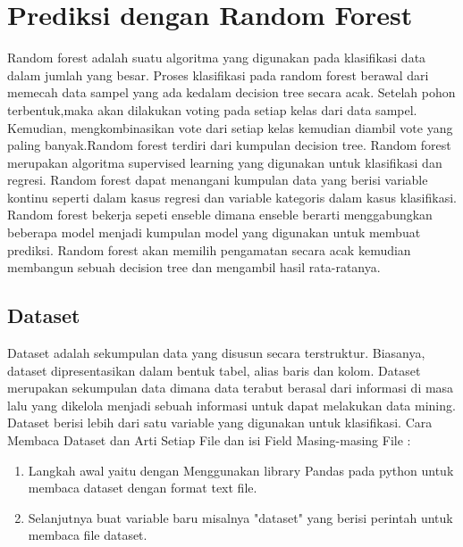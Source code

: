\chapter{Prediksi dengan Random Forest}

Random forest adalah suatu algoritma yang digunakan pada klasifikasi data dalam jumlah yang besar. Proses klasifikasi pada random forest berawal dari memecah data sampel yang ada kedalam decision tree secara acak. Setelah pohon terbentuk,maka akan dilakukan voting pada setiap kelas dari data sampel. Kemudian, mengkombinasikan vote dari setiap kelas kemudian diambil vote yang paling banyak.Random forest terdiri dari kumpulan decision tree. Random forest merupakan algoritma supervised learning yang digunakan untuk klasifikasi dan regresi. Random forest dapat menangani kumpulan data yang berisi variable kontinu seperti dalam kasus regresi dan variable kategoris dalam kasus klasifikasi. Random forest bekerja sepeti enseble dimana enseble berarti menggabungkan beberapa model menjadi kumpulan model yang digunakan untuk membuat prediksi. Random forest akan memilih pengamatan secara acak kemudian membangun sebuah decision tree dan mengambil hasil rata-ratanya.

\section{Dataset}
Dataset adalah sekumpulan data yang disusun secara terstruktur. Biasanya, dataset dipresentasikan dalam bentuk tabel, alias baris dan kolom. Dataset merupakan sekumpulan data dimana data terabut berasal dari informasi di masa lalu yang dikelola menjadi sebuah informasi untuk dapat melakukan data mining. Dataset berisi lebih dari satu variable yang digunakan untuk klasifikasi. Cara Membaca Dataset dan Arti Setiap File dan isi Field Masing-masing File :
\begin{enumerate}
    \item Langkah awal yaitu dengan Menggunakan library Pandas pada python untuk membaca dataset dengan format text file.
    \item Selanjutnya buat variable baru misalnya "dataset" yang berisi perintah untuk membaca file dataset.
\end{enumerate}

